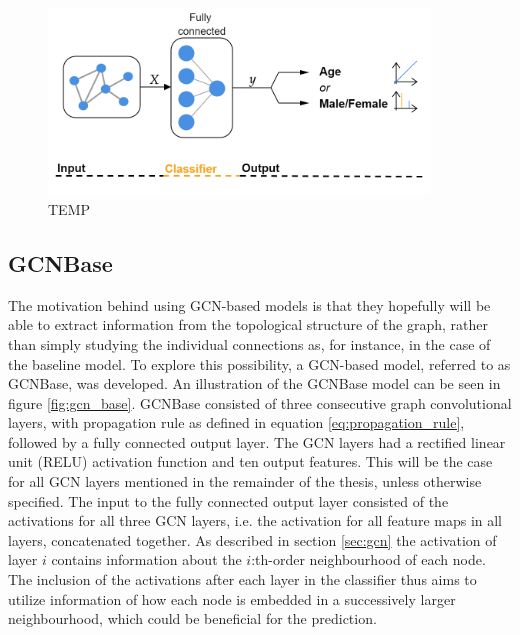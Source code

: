 %         

\begin{figure}[H]
    \centering
    \includegraphics[width=0.9\textwidth]{chapters/images_methods/ffnn_v2.png}
    \caption{TEMP}
    \label{fig:Graph_class_baseline}
\end{figure}

\subsection{GCNBase}

The motivation behind using GCN-based models is that they hopefully will be able to extract information from the topological structure of the graph, rather than simply studying the individual connections as, for instance, in the case of the baseline model. To explore this possibility, a GCN-based model, referred to as GCNBase, was developed. An illustration of the GCNBase model can be seen in figure \ref{fig:gcn_base}. GCNBase consisted of three consecutive graph convolutional layers, with propagation rule as defined in equation \eqref{eq:propagation_rule}, followed by a fully connected output layer. The GCN layers had a rectified linear unit (RELU) activation function and ten output features. This will be the case for all GCN layers mentioned in the remainder of the thesis, unless otherwise specified. The input to the fully connected output layer consisted of the activations for all three GCN layers, i.e. the activation for all feature maps in all layers, concatenated together. As described in section \ref{sec:gcn} the activation of layer $i$ contains information about the $i$:th-order neighbourhood of each node. The inclusion of the activations after each layer in the classifier thus aims to utilize information of how each node is embedded in a successively larger neighbourhood, which could be beneficial for the prediction.


